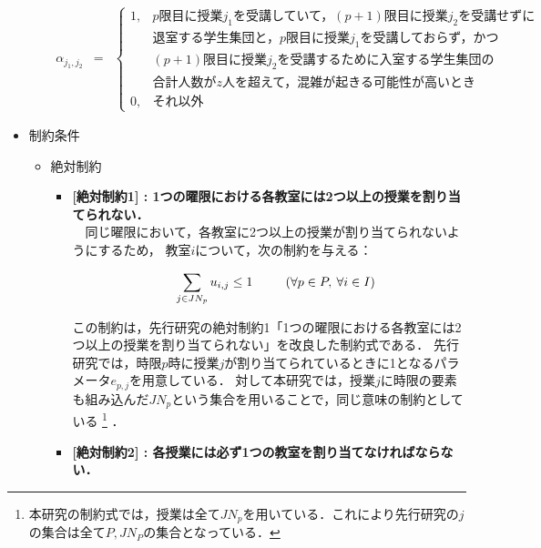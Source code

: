 \documentclass[12pt, a4paper, fleqn]{jreport}
\begin{document}
\begin{itemize}
\begin{itemize}
\[\begin{array}{rcl}
 \alpha_{j_1,j_2} & = & \left\{ 
\begin{array}{ll}
1, & \mbox{$p$限目に授業$j_1$を受講していて，$(p+1)$限目に授業$j_2$を受講せずに}\\
& \mbox{退室する学生集団と，$p$限目に授業$j_1$を受講しておらず，かつ}\\
& \mbox{$(p+1)$限目に授業$j_2$を受講するために入室する学生集団の}\\
& \mbox{合計人数が$z$人を超えて，混雑が起きる可能性が高いとき}\\
0, & \mbox{それ以外}
\end{array}
\right.
\end{array}
\]
\end{itemize}
\vspace{3.0mm}

\item 制約条件\\
\begin{itemize}
\item{絶対制約}\\
\begin{itemize}

\item {\bf  [絶対制約1] : 1つの曜限における各教室には2つ以上の授業を割り当てられない．}\\
　同じ曜限において，各教室に2つ以上の授業が割り当てられないようにするため，
教室$i$について，次の制約を与える：

\vspace{-3.0mm}
\begin{eqnarray}
\label{hzettai1} 
&&\sum_{j \in JN_{p}} u_{i,j} \leq 1 \hspace{5.0mm}
\quad \left (\forall p \in P, \: \forall i \in I \right)
\end{eqnarray} 

\vspace{5.0mm}
この制約は，先行研究の絶対制約1「1つの曜限における各教室には2つ以上の授業を割り当てられない」を改良した制約式である．
先行研究では，時限$p$時に授業$j$が割り当てられているときに1となるパラメータ$e_{p,j}$を用意している．
対して本研究では，授業$j$に時限の要素も組み込んだ$JN_p$という集合を用いることで，同じ意味の制約としている
\footnote{本研究の制約式では，授業は全て$JN_p$を用いている．これにより先行研究の$j$の集合は全て$P,JN_P$の集合となっている．}
．
\vspace{3.0mm}
\item {\bf  [絶対制約2] : 各授業には必ず1つの教室を割り当てなければならない．}\\


\end{itemize}
\end{itemize}
\end{itemize}
\end{document}
